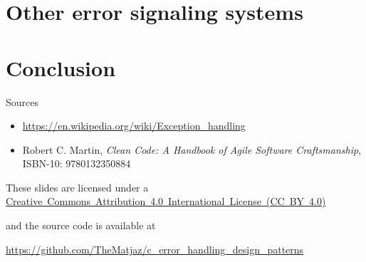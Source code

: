 \documentclass[aspectratio=169,14pt]{beamer}
\begin{document}
\section{Other error signaling systems}

\section{Conclusion}

\begin{frame}{Sources}
    \begin{itemize}
        \item \url{https://en.wikipedia.org/wiki/Exception_handling}
        \item Robert C. Martin, \textit{Clean Code: A Handbook of Agile Software Craftsmanship}, ISBN-10: 9780132350884 
    \end{itemize}
    
    \begin{footnotesize}
        \begin{center}
            These slides are licensed under a \href{https://creativecommons.org/licenses/by/4.0/}{Creative~Commons~Attribution~4.0~International~License~(CC~BY~4.0)}
            
            and the source code is available at
            
            \url{https://github.com/TheMatjaz/c_error_handling_design_patterns}
        \end{center}    
    \end{footnotesize}
\end{frame}
\end{document}
